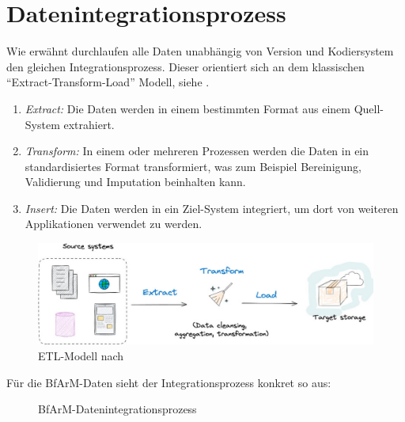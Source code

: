 \section{Datenintegrationsprozess}

Wie erwähnt durchlaufen alle Daten unabhängig von Version und Kodiersystem den gleichen Integrationsprozess. Dieser orientiert sich an dem klassischen ``Extract-Transform-Load'' Modell, siehe \citep[Seite 247ff]{bonnefoy2024definitive}.

\begin{enumerate}
\item \emph{Extract:} Die Daten werden in einem bestimmten Format aus einem Quell-System extrahiert. 
\item \emph{Transform:} In einem oder mehreren Prozessen werden die Daten in ein standardisiertes Format transformiert, was zum Beispiel Bereinigung, Validierung und Imputation beinhalten kann.
\item \emph{Insert:} Die Daten werden in ein Ziel-System integriert, um dort von weiteren Applikationen verwendet zu werden. 
\end{enumerate}

\vspace{10pt}

\begin{figure}[H]
    \centering
    \includegraphics[width=\linewidth]{../img/etl.jpg}
    \caption{ETL-Modell nach \citep[Seite 63]{bonnefoy2024definitive}}
\end{figure}

\newpage %

Für die BfArM-Daten sieht der Integrationsprozess konkret so aus:

\begin{figure}[H]
    \centering
    \resizebox{.9\textwidth}{!}{}
    \caption{BfArM-Datenintegrationsprozess}
\end{figure}

